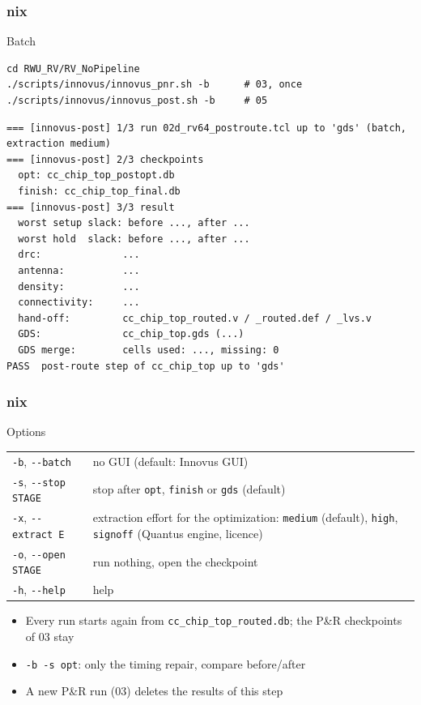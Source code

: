 \documentclass{beamer}
\newcommand{\astitle}{nix}
\newcommand{\assubtitle}{nix}
\newcommand{\cmd}[1]{\texttt{#1}}
\begin{document}
\renewcommand{\assubtitle}{Batch}
\begin{frame}[fragile]
\frametitle{\astitle}
\begin{block}{\assubtitle}
  \footnotesize
\begin{lstlisting}[style=sh,basicstyle=\ttfamily\small]
cd RWU_RV/RV_NoPipeline
./scripts/innovus/innovus_pnr.sh -b      # 03, once
./scripts/innovus/innovus_post.sh -b     # 05
\end{lstlisting}
\begin{lstlisting}[style=out]
=== [innovus-post] 1/3 run 02d_rv64_postroute.tcl up to 'gds' (batch, extraction medium)
=== [innovus-post] 2/3 checkpoints
  opt: cc_chip_top_postopt.db
  finish: cc_chip_top_final.db
=== [innovus-post] 3/3 result
  worst setup slack: before ..., after ...
  worst hold  slack: before ..., after ...
  drc:              ...
  antenna:          ...
  density:          ...
  connectivity:     ...
  hand-off:         cc_chip_top_routed.v / _routed.def / _lvs.v
  GDS:              cc_chip_top.gds (...)
  GDS merge:        cells used: ..., missing: 0
PASS  post-route step of cc_chip_top up to 'gds'
\end{lstlisting}
\end{block}
\end{frame}

\renewcommand{\assubtitle}{Options}
\begin{frame}
\frametitle{\astitle}
\begin{block}{\assubtitle}
  \footnotesize
  \begin{tabularx}{\linewidth}{@{}lY@{}}
    \cmd{-b}, \cmd{-{}-batch}        & no GUI (default: Innovus GUI)\\[2pt]
    \cmd{-s}, \cmd{-{}-stop STAGE}   & stop after \cmd{opt}, \cmd{finish} or
                                       \cmd{gds} (default)\\[2pt]
    \cmd{-x}, \cmd{-{}-extract E}    & extraction effort for the optimization:
                                       \cmd{medium} (default), \cmd{high},
                                       \cmd{signoff} (Quantus engine, licence)\\[2pt]
    \cmd{-o}, \cmd{-{}-open STAGE}   & run nothing, open the checkpoint\\[2pt]
    \cmd{-h}, \cmd{-{}-help}         & help\\
  \end{tabularx}
  \vspace{6pt}
  \begin{itemize}
    \item Every run starts again from \cmd{cc\_chip\_top\_routed.db}; the
      P\&R checkpoints of 03 stay
    \item \cmd{-b -s opt}: only the timing repair, compare before/after
    \item A new P\&R run (03) deletes the results of this step
  \end{itemize}
\end{block}
\end{frame}
\end{document}
